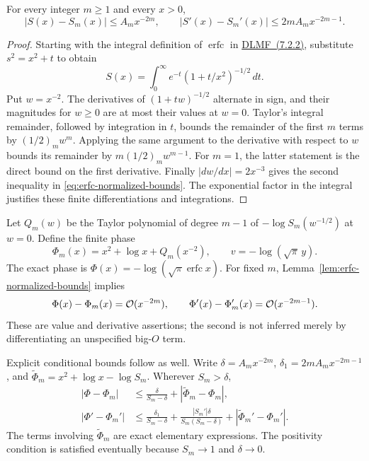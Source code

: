 \begin{lemma}
\label{lem:erfc-normalized-bounds}
For every integer $m\ge1$ and every $x>0$,
\begin{equation}
 |S(x)-S_m(x)|\le A_m x^{-2m},\qquad
 |S'(x)-S_m'(x)|\le 2m A_m x^{-2m-1}.
 \label{eq:erfc-normalized-bounds}
\end{equation}
\end{lemma}
\begin{proof}
Starting with the integral definition of $\operatorname{erfc}$ in
\href{https://dlmf.nist.gov/7.2.E2}{DLMF~(7.2.2)}, substitute
$s^2=x^2+t$ to obtain
\begin{equation}
 S(x)=\int_0^\infty e^{-t}(1+t/x^2)^{-1/2}\,dt.
 \label{eq:erfc-normalized-integral}
\end{equation}
Put $w=x^{-2}$. The derivatives of $(1+tw)^{-1/2}$ alternate in sign, and
their magnitudes for $w\ge0$ are at most their values at $w=0$.
Taylor's integral remainder, followed by integration in $t$, bounds the
remainder of the first $m$ terms by $(1/2)_m w^m$.
Applying the same argument to the derivative with respect to $w$ bounds
its remainder by $m(1/2)_m w^{m-1}$. For $m=1$, the latter statement is
the direct bound on the first derivative. Finally
$|dw/dx|=2x^{-3}$ gives the second inequality in
\eqref{eq:erfc-normalized-bounds}. The exponential factor in the integral
justifies these finite differentiations and integrations.
\end{proof}

Let $Q_m(w)$ be the Taylor polynomial of degree $m-1$ of
$-\log S_m(w^{-1/2})$ at $w=0$. Define the finite phase
\begin{equation}
 \Phi_m(x)=x^2+\log x+Q_m(x^{-2}),
 \qquad v=-\log(\sqrt\pi\,y).
 \label{eq:erfc-finite-phase}
\end{equation}
The exact phase is $\Phi(x)=-\log(\sqrt\pi\operatorname{erfc}x)$.
For fixed $m$, Lemma~\ref{lem:erfc-normalized-bounds} implies
\begin{equation}
 \Phi(x)-\Phi_m(x)=\mathcal O(x^{-2m}),\qquad
 \Phi'(x)-\Phi_m'(x)=\mathcal O(x^{-2m-1}).
 \label{eq:erfc-phase-errors}
\end{equation}
These are value and derivative assertions; the second is not inferred
merely by differentiating an unspecified big-$O$ term.

Explicit conditional bounds follow as well. Write
$\delta=A_mx^{-2m}$, $\delta_1=2mA_mx^{-2m-1}$, and
$\widetilde\Phi_m=x^2+\log x-\log S_m$. Wherever $S_m>\delta$,
\begin{align}
 |\Phi-\Phi_m|
 &\le\frac{\delta}{S_m-\delta}
       +|\widetilde\Phi_m-\Phi_m|,
       \label{eq:erfc-explicit-phase-bound}\\
 |\Phi'-\Phi_m'|
 &\le\frac{\delta_1}{S_m-\delta}
 +\frac{|S_m'|\delta}{S_m(S_m-\delta)}
 +|\widetilde\Phi_m'-\Phi_m'|.
 \label{eq:erfc-explicit-phase-derivative-bound}
\end{align}
The terms involving $\widetilde\Phi_m$ are exact elementary expressions.
The positivity condition is satisfied
eventually because $S_m\to1$ and $\delta\to0$.

